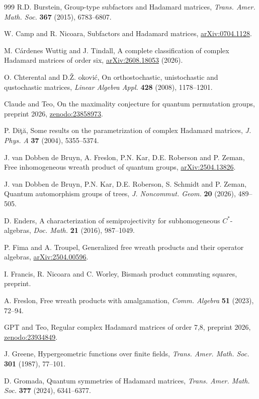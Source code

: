 \documentclass[11pt]{amsart}
\newcommand{\arx}[1]{{\hypersetup{allcolors=black}\href{https://arxiv.org/pdf/#1}{arXiv:#1}}}
\begin{document}
\begin{thebibliography}{999}
 R.D. Burstein, Group-type subfactors and Hadamard matrices, {\em Trans. Amer. Math. Soc.} {\bf 367} (2015), 6783--6807.

 W. Camp and R. Nicoara, Subfactors and Hadamard matrices, \arx{0704.1128}.

 M. C\'ardenes Wuttig and J. Tindall, A complete classification of complex Hadamard matrices of order six, \arx{2608.18053} (2026).

 O. Chterental and D.\v{Z}. \DJ okovi\'c, On orthostochastic, unistochastic and qustochastic matrices, {\em Linear Algebra Appl.} {\bf 428} (2008), 1178--1201.

 Claude and Teo, On the maximality conjecture for quantum permutation groups, preprint 2026, \href{https://zenodo.org/records/23858973}{zenodo:23858973}.

 P. Di\c t\u a, Some results on the parametrization of complex Hadamard matrices, {\em J. Phys. A} {\bf 37} (2004), 5355--5374.

 J. van Dobben de Bruyn, A. Freslon, P.N. Kar, D.E. Roberson and P. Zeman, Free inhomogeneous wreath product of quantum groups, \arx{2504.13826}.

 J. van Dobben de Bruyn, P.N. Kar, D.E. Roberson, S. Schmidt and P. Zeman, Quantum automorphism groups of trees, {\em J. Noncommut. Geom.} {\bf 20} (2026), 489--505.

 D. Enders, A characterization of semiprojectivity for subhomogeneous $C^*$-algebras, {\em Doc. Math.} {\bf 21} (2016), 987--1049.

 P. Fima and A. Troupel, Generalized free wreath products and their operator algebras, \arx{2504.00596}.

 I. Francis, R. Nicoara and C. Worley, Bismash product commuting squares, preprint.

 A. Freslon, Free wreath products with amalgamation, {\em Comm. Algebra} {\bf 51} (2023), 72--94.

 GPT and Teo, Regular complex Hadamard matrices of order 7,8, preprint 2026, \href{https://zenodo.org/records/23934849}{zenodo:23934849}.

 J. Greene, Hypergeometric functions over finite fields, {\em Trans. Amer. Math. Soc.} {\bf 301} (1987), 77--101.

 D. Gromada, Quantum symmetries of Hadamard matrices, {\em Trans. Amer. Math. Soc.} {\bf 377} (2024), 6341--6377.


\end{thebibliography}
\end{document}

